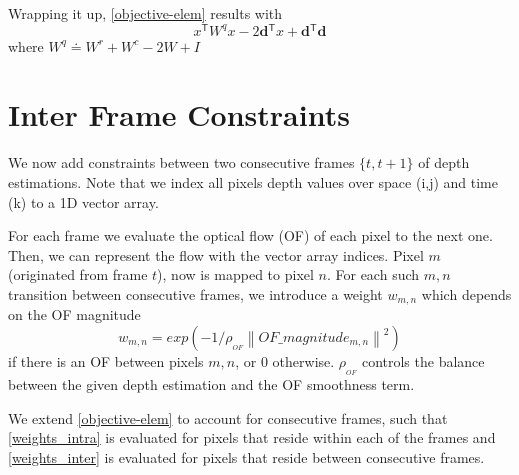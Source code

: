 \documentclass{article}
\newcommand{\norm}[1]{\left\lVert #1 \right\rVert}
\newcommand\mat[1]{{#1}}
\newcommand{\T}{{}^\mathsf{T}}
\newcommand{\eqdef}{\doteq}
\renewcommand\vec[1]{\mathbf{#1}}
\begin{document}
Wrapping it up, \eqref{objective-elem} results with
\begin{equation}
x\T \mat{W}^{q} x - 2 \vec{d}\T x + \vec{d}\T \vec{d}
\end{equation}
where $\mat{W}^{q} \eqdef \mat{W^{r}} + \mat{W^{c}} - 2\mat{W} + \mat{I} $




\section{Inter Frame Constraints}

We now add constraints between two consecutive frames $\{t, t+1\}$ of depth estimations. Note that we index all pixels depth values over space (i,j) and time (k) to a 1D vector array. 

For each frame we evaluate the optical flow (OF) of each pixel to the next one. Then, we can represent the flow with the vector array indices. Pixel $m$ (originated from frame $t$), now is mapped to pixel $n$. For each such $m,n$ transition between consecutive frames, we introduce a weight $w_{m,n}$ which depends on the OF magnitude
\begin{equation}
w_{m,n} = exp(-1/\rho_{_{OF}} \norm{OF\_magnitude_{m,n}}^2)
\label{weights_inter}
\end{equation}
if there is an OF between pixels $m,n$, or $0$ otherwise. 
$\rho_{_{OF}}$ controls the balance between the given depth estimation and the OF smoothness term.

We extend \eqref{objective-elem} to account for consecutive frames, such that \eqref{weights_intra} is evaluated for pixels that reside within each of the frames and \eqref{weights_inter} is evaluated for pixels that reside between consecutive frames.
\end{document}
